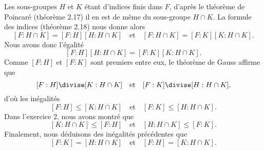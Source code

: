 Les sous-groupes $H$ et $K$ étant d'indices finis dans $F$, d'après le théorème
de Poincaré (théorème 2.17) il en est de même du sous-groupe $H\cap K$. 
La formule des indices (théorème 2.18) nous donne alors
\[
  [F:H\cap K] = [F:H][H:H\cap K]
  \quad\text{et}\quad
  [F:H\cap K] = [F:K][K:H\cap K].
\]
Nous avons donc l'égalité
\[
  [F:H][H:H\cap K] = [F:K][K:H\cap K].
\]
Comme $[F:H]$ et $[F:K]$ sont premiers entre eux, le théorème de Gauss affirme
que
\[
  [F:H] \divise [K:H\cap K]
  \quad\text{et}\quad
  [F:K] \divise [H:H\cap K],
\]
d'où les inégalités
\[
  [F:H] \leq [K:H\cap K]
  \quad\text{et}\quad
  [F:K] \leq [H:H\cap K].
\]
Dans l'exercice 2, nous avons montré que
\[
  [K:H\cap K]\leq [F:H]
  \quad\text{et}\quad
  [H:H\cap K]\leq [F:K].
\]
Finalement, nous déduisons des inégalités précédentes que
\[
  [F:K] = [H:H\cap K]
  \quad\text{et}\quad
  [F:H] = [K:H\cap K].
\]
